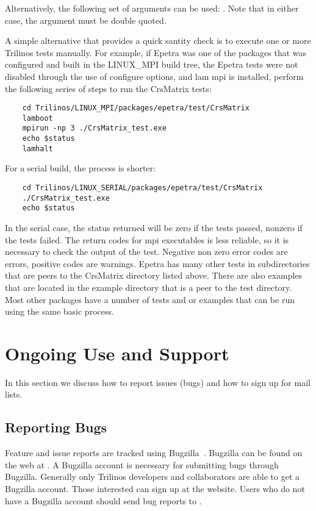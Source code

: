 \documentclass[12pt,relax]{TrilinosUserGuide}
\begin{document}

Alternatively, the following set of arguments can be used: \newline
{}.
Note that in either case, the  argument
must be double quoted.

A simple alternative that provides a quick santity check is to execute one
or more Trilinos tests manually.  For example, if Epetra was one of the
packages that was configured and built in the LINUX\_MPI build tree, the
Epetra tests were not disabled through the use of configure options, and
lam mpi is installed, perform
the following series of steps to run the CrsMatrix tests:

\begin{verbatim}
	cd Trilinos/LINUX_MPI/packages/epetra/test/CrsMatrix
	lamboot
	mpirun -np 3 ./CrsMatrix_test.exe
	echo $status
	lamhalt
\end{verbatim}

For a serial build, the process is shorter:

\begin{verbatim}
	cd Trilinos/LINUX_SERIAL/packages/epetra/test/CrsMatrix
	./CrsMatrix_test.exe
	echo $status
\end{verbatim}

In the serial case, the status returned will be zero if the tests passed,
nonzero if the tests failed.  The return codes for mpi executables is less
reliable, so it is necessary to check the output of the test.  Negative
non zero error codes are errors, positive codes are warnings.  Epetra has
many other tests in subdirectories that are peers to the CrsMatrix directory
listed above.  There are also examples that are located in the example
directory that is a peer to the test directory.  Most other packages have a
number of tests and or examples that can be run using the same basic process.


\section{Ongoing Use and Support}
\label{Section:UseSupport}
In this section we discuss how to report issues (bugs) and how to sign up
for mail lists.

\subsection{Reporting Bugs}
\label{subsect:Bugzilla}
Feature and issue reports are tracked using Bugzilla~\cite{Bugzilla}.
Bugzilla can be found on the web at
.
A Bugzilla account is necessary for submitting bugs through Bugzilla.  Generally only Trilinos
developers and collaborators are able to get a Bugzilla account.  Those interested can
sign up at the website.  Users who do not have a Bugzilla account should send bug reports
to .
\end{document}
